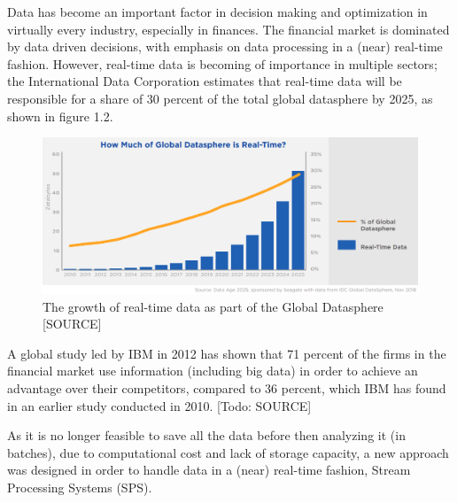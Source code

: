 Data has become an important factor in decision making and optimization in virtually every industry, especially in finances. 
The financial market is dominated by data driven decisions, with emphasis on data processing in a (near) real-time fashion.
However, real-time data is becoming of importance in multiple sectors; the International Data Corporation estimates that real-time data will be 
responsible for a share of 30 percent of the total global datasphere by 2025, as shown in figure 1.2.
\begin{figure}
\centering
\includegraphics[width=1.0\textwidth]{Bilder/realtime_data.png}
\caption{The growth of real-time data as part of the Global Datasphere [SOURCE]}
\label{fig:growth_realtime_data}
\end{figure}

A global study led by IBM in 2012 has shown that 71 percent of the firms in the financial market use information (including big data)
in order to achieve an advantage over their competitors, compared to 36 percent, which IBM has found in an earlier study conducted in 2010. [Todo: SOURCE]

As it is no longer feasible to save all the data before then analyzing it (in batches), due to computational cost and lack of storage capacity, 
a new approach was designed in order to handle data in a (near) real-time fashion, Stream Processing Systems (SPS).
